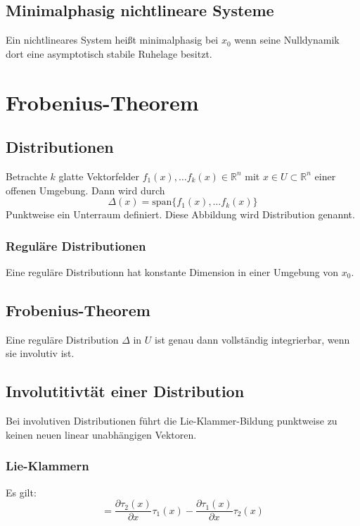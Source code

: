 \subsection{Minimalphasig nichtlineare Systeme}
Ein nichtlineares System heißt minimalphasig bei $x_0$ wenn seine Nulldynamik dort eine
asymptotisch stabile Ruhelage besitzt.

\section{Frobenius-Theorem}
\subsection{Distributionen}
Betrachte $k$ glatte Vektorfelder $f_1(x), \ldots f_k(x) \in \mathbb{R}^n$ mit 
$x \in U \subset \mathbb{R}^n$ einer offenen Umgebung. Dann wird durch
\begin{equation}
    \Delta(x) = \text{span}\{f_1(x), \ldots f_k(x)\}
\end{equation}
Punktweise ein Unterraum definiert. Diese Abbildung wird Distribution genannt.

\subsubsection{Reguläre Distributionen}
Eine reguläre Distributionn hat konstante Dimension in einer Umgebung von $x_0$.

\subsection{Frobenius-Theorem}
Eine reguläre Distribution $\Delta$ in $U$ ist genau dann vollständig integrierbar, wenn
sie involutiv ist.

\subsection{Involutitivtät einer Distribution}
Bei involutiven Distributionen führt die Lie-Klammer-Bildung punktweise zu keinen neuen
linear unabhängigen Vektoren.

\subsubsection{Lie-Klammern}
Es gilt:
\begin{equation}
    [\tau_1(x), \tau_2(x)] = \frac{\partial \tau_2(x)}{\partial x} \tau_1(x) - \frac{\partial \tau_1(x)}{\partial x} \tau_2(x)
\end{equation}

